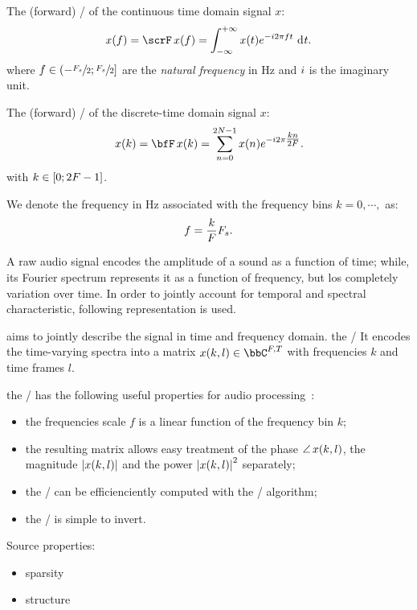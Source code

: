 The (forward) \FTdef/ of the continuous time domain signal $x$:
\begin{equation}
    x(f) = \fourierTrans{x}(f) =
        \int_{-\infty}^{+\infty}
        x(t)
        \cste^{-\csti 2 \pi f t}
        \,\kdiff{t}.
\end{equation}
where $f \in \kintervoc{-\sfrac{\Fs}{2}}{\sfrac{\Fs}{2}}$ are the \textit{natural frequency} in $\si{\Hz}$ and ${i}$ is the imaginary unit.

The (forward) \DFTdef/ of the discrete-time domain signal $x$:
\begin{equation}\label{eq:processing:dft}
    x(k) = \discreteFT{x}(k) =
    \sum_{n = 0}^{2 N - 1}
    x(n)
    \cste^{-\csti2\pi \tfrac{k n}{2 F}}.
\end{equation}
with $k \in \kintervcc{0}{2 F - 1}$.

We denote the frequency in $\si{\Hz}$ associated with the frequency bins $k = 0, \cdots, $ as:
\begin{equation}
    f = \frac{k}{F}F_s.
\end{equation}

A raw audio signal encodes the amplitude of a sound as a function of time; while, its Fourier spectrum
represents it as a function of frequency, but los completely variation over time.
In order to jointly account for temporal and spectral characteristic, following representation is used.

 aims to jointly describe the signal in time and frequency domain.
the \STFTdef/ It encodes the time-varying spectra into a matrix $x(k,l) \in \bbC^{F,T}$ with frequencies $k$ and time frames $l$.

the \STFT/ has the following useful properties for audio processing~\cite{vincent2018audio}:
\begin{itemize}
    \item the frequencies scale $f$ is a linear function of the frequency bin $k$;
    \item the resulting matrix allows easy treatment of
          the phase $\operatorname*{\angle}{x(k,l)}$, the magnitude $\magnitudeOf{x(k,l)}$ and the power $\powerOf{x(k,l)}$ separately;
    \item the \DFT/ can be efficienciently computed with the \FFT/ algorithm;
    \item the \STFT/ is simple to invert.
\end{itemize}
Source properties:
\begin{itemize}
    \item sparsity
    \item structure
\end{itemize}

